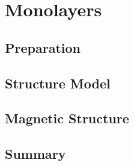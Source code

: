 \documentclass[\main/dresen_thesis.tex]{subfiles}
\renewcommand{\thisPath}{\main/chapters/monolayers}
\begin{document}
  \chapter{Monolayers}\label{ch:monolayers}
    

    
      \FloatBarrier
      \clearpage

    \section{Preparation}
      
      \FloatBarrier
      \clearpage

    \section{Structure Model}
      
      \FloatBarrier

    \section{Magnetic Structure}
      
      \FloatBarrier

    \section{Summary}
      
\end{document}
